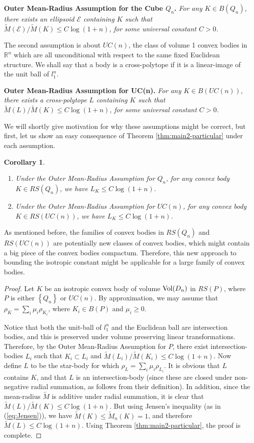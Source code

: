 \documentclass[12pt,oneside]{amsart}
\newtheorem{cor}[thm]{Corollary}
\theoremstyle{definition}
\theoremstyle{remark}
\theoremstyle{proof}
\numberwithin{equation}{section}
\newcommand{\set}[1]{\left\{#1\right\}}
\newcommand{\Real}{\mathbb{R}}
\newcommand{\E}{\mathcal{E}}
\renewcommand{\MR}{\widetilde{M}} %
\newcommand{\Vol}[1]{\textnormal{Vol} (#1)}
\begin{document}
\medskip
\noindent\textbf{Outer Mean-Radius Assumption for the Cube $Q_n$.}
\emph{For any $K\in B(Q_n)$, there exists an ellipsoid $\E$
containing $K$ such that $\MR(\E) / \MR(K) \leq C \log(1+n)$, for
some universal constant $C>0$.}
\medskip

The second assumption is about $UC(n)$, the class of volume 1
convex bodies in $\Real^n$ which are all unconditional with
respect to the same fixed Euclidean structure. We shall say that
a body is a cross-polytope if it is a linear-image of the unit
ball of $l^n_1$.

\medskip
\noindent\textbf{Outer Mean-Radius Assumption for UC(n).}
\emph{For any $K \in B(UC(n))$, there exists a cross-polytope $L$
containing $K$ such that $\MR(L) / \MR(K) \leq C \log(1+n)$, for
some universal constant $C>0$. }
\medskip

We will shortly give motivation for why these assumptions might
be correct, but first, let us show an easy consequence of Theorem
\ref{thm:main2-particular} under each assumption.

\begin{cor} \hfill
\begin{enumerate}
\item
Under the Outer Mean-Radius Assumption for $Q_n$, for any convex
body $K \in RS(Q_n)$, we have $L_K \leq C \log(1+n)$.
\item
Under the Outer Mean-Radius Assumption for $UC(n)$, for any convex
body $K \in RS(UC(n))$, we have $L_K \leq C \log(1+n)$.
\end{enumerate}
\end{cor}
\noindent As mentioned before, the families of convex bodies in
$RS(Q_n)$ and $RS(UC(n))$ are potentially new classes of convex
bodies, which might contain a big piece of the convex bodies
compactum. Therefore, this new approach to bounding the isotropic
constant might be applicable for a large family of convex bodies.
\begin{proof}
Let $K$ be an isotropic convex body of volume $\Vol{D_n}$ in
$RS(P)$, where $P$ is either $\set{Q_n}$ or $UC(n)$. By
approximation, we may assume that $\rho_K = \sum_i \mu_i
\rho_{K_i}$, where $K_i \in B(P)$ and $\mu_i \geq 0$.

Notice that both the unit-ball of $l_1^n$ and the Euclidean ball
are intersection bodies, and this is preserved under volume
preserving linear transformations. Therefore, by the Outer
Mean-Radius Assumption for $P$, there exist intersection-bodies
$L_i$ such that $K_i \subset L_i$ and $\MR(L_i) / \MR(K_i) \leq C
\log(1+n)$. Now define $L$ to be the star-body for which $\rho_L
= \sum_i \mu_i \rho_{L_i}$. It is obvious that $L$ contains $K$,
and that $L$ is an intersection-body (since these are closed
under non-negative radial summation, as follows from their
definition). In addition, since the mean-radius $\MR$ is additive
under radial summation, it is clear that $\MR(L) / \MR(K) \leq C
\log(1+n)$. But using Jensen's inequality (as in
(\ref{eq:Jensen})), we have $\MR(K) \leq \MR_n(K) = 1$, and
therefore $\MR(L) \leq C \log(1+n)$. Using Theorem
\ref{thm:main2-particular}, the proof is complete.
\end{proof}
\end{document}
